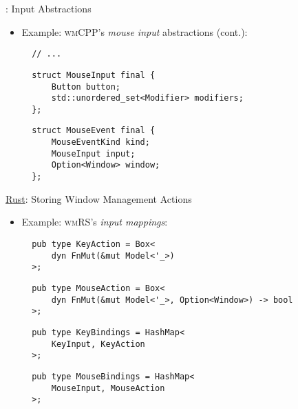 \begin{frame}[fragile]{\underline{\cpp}: Input Abstractions \hfill {\footnotesize \currentname}}


    \begin{itemize}

        \item Example: \textsc{wmCPP}'s \textit{mouse input} abstractions (cont.):\\[3pt]
\begin{verbatim}
  // ...
\end{verbatim}
\begin{verbatim}
  struct MouseInput final {
      Button button;
      std::unordered_set<Modifier> modifiers;
  };
\end{verbatim}
\begin{verbatim}
  struct MouseEvent final {
      MouseEventKind kind;
      MouseInput input;
      Option<Window> window;
  };
\end{verbatim}

    \end{itemize}

    \vfill

\end{frame}

\begin{frame}[fragile]{\underline{Rust}: Storing Window Management Actions \hfill {\footnotesize \currentname}}


    \begin{itemize}

        \item Example: \textsc{wmRS}'s \textit{input mappings}:\\[3pt]
\begin{verbatim}
  pub type KeyAction = Box<
      dyn FnMut(&mut Model<'_>)
  >;
\end{verbatim}
\begin{verbatim}
  pub type MouseAction = Box<
      dyn FnMut(&mut Model<'_>, Option<Window>) -> bool
  >;
\end{verbatim}
\begin{verbatim}
  pub type KeyBindings = HashMap<
      KeyInput, KeyAction
  >;
\end{verbatim}
\begin{verbatim}
  pub type MouseBindings = HashMap<
      MouseInput, MouseAction
  >;
\end{verbatim}

    \end{itemize}

    \vfill

\end{frame}

